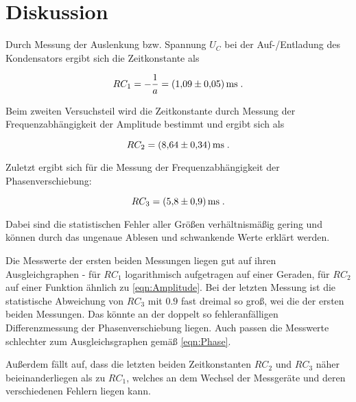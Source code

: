 \section{Diskussion}
\label{sec:Diskussion}

Durch Messung der Auslenkung bzw. Spannung $U_C$ bei der Auf-/Entladung des Kondensators 
ergibt sich  die Zeitkonstante als

\begin{equation*}
RC_1 = -\frac{1}{a} = \SI{1.09+-0.05}{\milli\second} \; .
\end{equation*}

Beim zweiten Versuchsteil wird die Zeitkonstante durch Messung der Frequenzabhängigkeit der
Amplitude bestimmt und ergibt sich als

\begin{equation*}
RC_2 = \SI{8.64+-0.34}{\milli\second} \; .
\end{equation*}

Zuletzt ergibt sich für die Messung der Frequenzabhängigkeit der Phasenverschiebung:

\begin{equation*}
    RC_3 = \SI{5.8+-0.9}{\milli\second} \; .
\end{equation*}

Dabei sind die statistischen Fehler aller Größen verhältnismäßig gering und können durch das ungenaue
Ablesen und schwankende Werte erklärt werden.

Die Messwerte der ersten
beiden Messungen liegen gut auf ihren Ausgleichgraphen - für $RC_1$ logarithmisch aufgetragen auf einer Geraden,
für $RC_2$ auf einer Funktion ähnlich zu \eqref{eqn:Amplitude}. Bei der letzten Messung ist die statistische
Abweichung von $RC_3$ mit $0.9$ fast dreimal so groß, wei die der ersten beiden Messungen. Das könnte an der doppelt
so fehleranfälligen Differenzmessung der Phasenverschiebung liegen. Auch passen die Messwerte schlechter zum Ausgleichsgraphen
gemäß \eqref{eqn:Phase}.

Außerdem fällt auf, dass die letzten beiden Zeitkonstanten $RC_2$ und $RC_3$ näher beieinanderliegen als zu $RC_1$,
welches an dem Wechsel der Messgeräte und deren verschiedenen Fehlern liegen kann.

